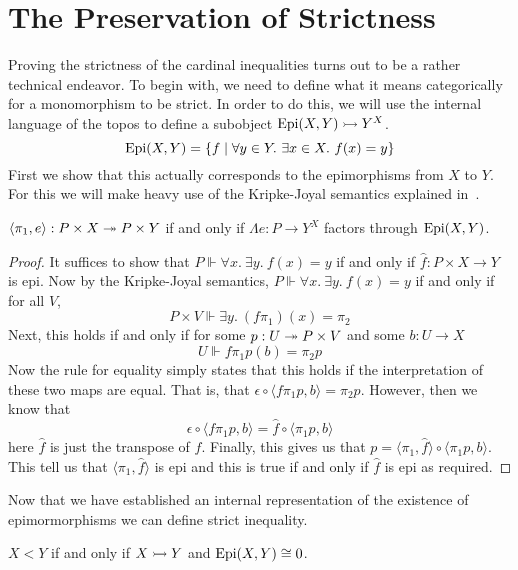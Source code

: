 \section{The Preservation of Strictness}\label{sec:strictness}

Proving the strictness of the cardinal inequalities turns out to be a
rather technical endeavor. To begin with, we need to define what it
means categorically for a monomorphism to be strict. In order to do
this, we will use the internal language of the topos to define a
subobject $\operatorname{Epi}(X, Y) \rightarrowtail Y^X$.
\[
  \epis(X, Y) = \{f \mid \forall y \in Y.\ \exists x \in X.\ f(x) = y\}
\]
First we show that this actually corresponds to the epimorphisms from
$X$ to $Y$. For this we will make heavy use of the Kripke-Joyal
semantics explained in~\citet[Chapter~6]{MacLane:92}.

\begin{lem}\label{lem:strictness:epis}
  $\langle \pi_1, e \rangle : P \times X \twoheadrightarrow P \times Y$ if and only if
  $\Lambda e : P \to Y^X$ factors through $\operatorname{Epi}(X, Y)$.
\end{lem}
\begin{proof}
  It suffices to show that $P \Vdash \forall x.\ \exists y.\ f(x) = y$
  if and only if $\hat{f} : P \times X \to Y$ is epi. Now by the
  Kripke-Joyal semantics, $P \Vdash \forall x.\ \exists y.\ f(x) = y$
  if and only if for all $V$,
  \[
    P \times V \Vdash \exists y.\ (f\pi_1)(x) = \pi_2
  \]
  Next, this holds if and only if for some $p : U \twoheadrightarrow P \times V$
  and some $b : U \to X$
  \[
    U \Vdash f\pi_1p(b) = \pi_2p
  \]
  Now the rule for equality simply states that this holds if the
  interpretation of these two maps are equal. That is, that
  $\epsilon \circ \langle f\pi_1p, b \rangle = \pi_2p$. However, then
  we know that
  \[
    \epsilon \circ \langle f\pi_1p, b \rangle =
    \hat{f} \circ \langle \pi_1 p, b \rangle
  \]
  here $\hat{f}$ is just the transpose of $f$. Finally, this gives us that
  $p = \langle \pi_1, \hat{f} \rangle \circ \langle \pi_1 p, b \rangle$.
  This tell us that $\langle \pi_1, \hat{f} \rangle$ is epi and this is
  true if and only if $\hat{f}$ is epi as required.
\end{proof}

Now that we have established an internal representation of the
existence of epimormorphisms we can define strict inequality.

\begin{defn}
  $X < Y$ if and only if $X \rightarrowtail Y$ and $\operatorname{Epi}(X, Y) \cong 0$.
\end{defn}


